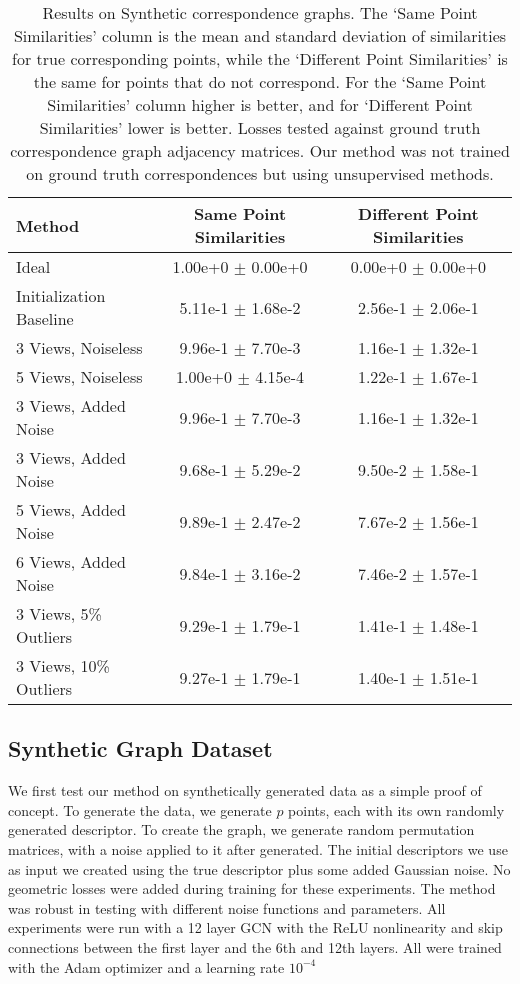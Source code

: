 \documentclass[10pt,twocolumn,letterpaper]{article}
\begin{document}
\begin{table*}
\begin{center}
\begin{tabular}{|l|c|c|}
\hline
Method & Same Point Similarities & Different Point Similarities  \\
\hline\hline\hline
Ideal                              & 1.00e+0 $\pm$ 0.00e+0 & 0.00e+0 $\pm$ 0.00e+0 \\ \hline
Initialization Baseline            & 5.11e-1 $\pm$ 1.68e-2 & 2.56e-1 $\pm$ 2.06e-1 \\ \hline
3 Views, Noiseless                 & 9.96e-1 $\pm$ 7.70e-3 & 1.16e-1 $\pm$ 1.32e-1 \\ \hline
5 Views, Noiseless                 & 1.00e+0 $\pm$ 4.15e-4 & 1.22e-1 $\pm$ 1.67e-1 \\ \hline
3 Views, Added Noise               & 9.96e-1 $\pm$ 7.70e-3 & 1.16e-1 $\pm$ 1.32e-1 \\ \hline
3 Views, Added Noise               & 9.68e-1 $\pm$ 5.29e-2 & 9.50e-2 $\pm$ 1.58e-1 \\ \hline
5 Views, Added Noise               & 9.89e-1 $\pm$ 2.47e-2 & 7.67e-2 $\pm$ 1.56e-1 \\ \hline
6 Views, Added Noise               & 9.84e-1 $\pm$ 3.16e-2 & 7.46e-2 $\pm$ 1.57e-1 \\ \hline
3 Views, 5\% Outliers              & 9.29e-1 $\pm$ 1.79e-1 & 1.41e-1 $\pm$ 1.48e-1 \\ \hline
3 Views, 10\% Outliers             & 9.27e-1 $\pm$ 1.79e-1 & 1.40e-1 $\pm$ 1.51e-1 \\ \hline

\hline
\end{tabular}
\end{center}
\caption{
Results on Synthetic correspondence graphs.
The `Same Point Similarities' column is the mean and standard deviation of similarities for true corresponding points, while the `Different Point Similarities' is the same for points that do not correspond.
For the `Same Point Similarities' column higher is better, and for `Different Point Similarities' lower is better.
Losses tested against ground truth correspondence graph adjacency matrices.
Our method was not trained on ground truth correspondences but using unsupervised methods.
}
\end{table*}
\subsection{Synthetic Graph Dataset}
We first test our method on synthetically generated data as a simple proof of concept.
To generate the data, we generate $p$ points, each with its own randomly generated descriptor.
To create the graph, we generate random permutation matrices, with a noise applied to it after generated.
The initial descriptors we use as input we created using the true descriptor plus some added Gaussian noise.
No geometric losses were added during training for these experiments.
The method was robust in testing with different noise functions and parameters.
All experiments were run with a 12 layer GCN with the ReLU nonlinearity and skip connections between the first layer and the 6th and 12th layers.
All were trained with the Adam optimizer and a learning rate $10^{-4}$
\end{document}
